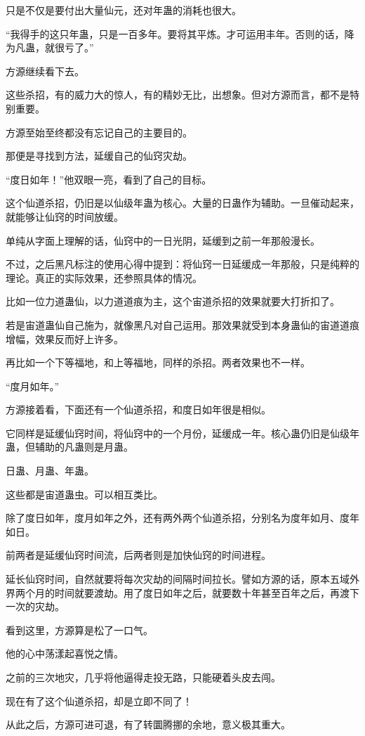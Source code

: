 \begin{this_body}
只是不仅是要付出大量仙元，还对年蛊的消耗也很大。

“我得手的这只年蛊，只是一百多年。要将其平炼。才可运用丰年。否则的话，降为凡蛊，就很亏了。”

方源继续看下去。

这些杀招，有的威力大的惊人，有的精妙无比，出想象。但对方源而言，都不是特别重要。

方源至始至终都没有忘记自己的主要目的。

那便是寻找到方法，延缓自己的仙窍灾劫。

“度日如年！”他双眼一亮，看到了自己的目标。

这个仙道杀招，仍旧是以仙级年蛊为核心。大量的日蛊作为辅助。一旦催动起来，就能够让仙窍的时间放缓。

单纯从字面上理解的话，仙窍中的一日光阴，延缓到之前一年那般漫长。

不过，之后黑凡标注的使用心得中提到：将仙窍一日延缓成一年那般，只是纯粹的理论。真正的实际效果，还参照具体的情况。

比如一位力道蛊仙，以力道道痕为主，这个宙道杀招的效果就要大打折扣了。

若是宙道蛊仙自己施为，就像黑凡对自己运用。那效果就受到本身蛊仙的宙道道痕增幅，效果反而好上许多。

再比如一个下等福地，和上等福地，同样的杀招。两者效果也不一样。

“度月如年。”

方源接着看，下面还有一个仙道杀招，和度日如年很是相似。

它同样是延缓仙窍时间，将仙窍中的一个月份，延缓成一年。核心蛊仍旧是仙级年蛊，但辅助的凡蛊则是月蛊。

日蛊、月蛊、年蛊。

这些都是宙道蛊虫。可以相互类比。

除了度日如年，度月如年之外，还有两外两个仙道杀招，分别名为度年如月、度年如日。

前两者是延缓仙窍时间流，后两者则是加快仙窍的时间进程。

延长仙窍时间，自然就要将每次灾劫的间隔时间拉长。譬如方源的话，原本五域外界两个月的时间就要渡劫。用了度日如年之后，就要数十年甚至百年之后，再渡下一次的灾劫。

看到这里，方源算是松了一口气。

他的心中荡漾起喜悦之情。

之前的三次地灾，几乎将他逼得走投无路，只能硬着头皮去闯。

现在有了这个仙道杀招，却是立即不同了！

从此之后，方源可进可退，有了转圜腾挪的余地，意义极其重大。


\end{this_body}
